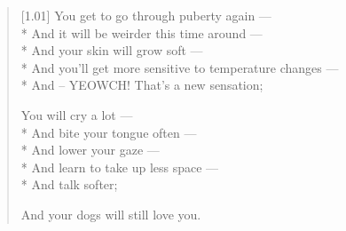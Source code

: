 \begin{verse}[1.01\textwidth]
  You get to go through puberty again ---\\*
  \vin And it will be weirder this time around ---\\*
  \vin And your skin will grow soft ---\\*
  \vin And you'll get more sensitive to temperature changes ---\\*
  \vin And -- YEOWCH! That's a new sensation;

  You will cry a lot ---\\*
  \vin And bite your tongue often ---\\*
  \vin And lower your gaze ---\\*
  \vin And learn to take up less space ---\\*
  \vin And talk softer;

  And your dogs will still love you.
\end{verse}

